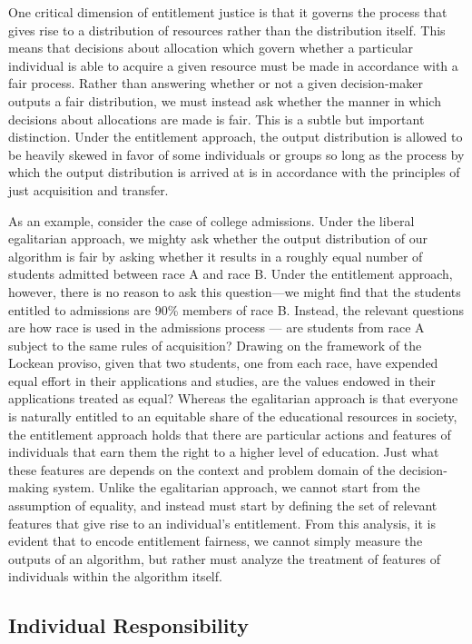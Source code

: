 One critical dimension of entitlement justice is that it governs the process
that gives rise to a distribution of resources rather than the distribution
itself. This means that decisions about allocation which govern whether a
particular individual is able to acquire a given resource must be made in
accordance with a fair process. Rather than answering whether or not a given
decision-maker outputs a fair distribution, we must instead ask whether the
manner in which decisions about allocations are made is fair. This is a
subtle but important distinction. Under the entitlement approach, the output
distribution is allowed to be heavily skewed in favor of some individuals or
groups so long as the process by which the output distribution is arrived at is
in accordance with the principles of just acquisition and transfer.

As an example, consider the case of college admissions. Under the liberal
egalitarian approach, we mighty ask whether the output distribution of our
algorithm is fair by asking whether it results in a roughly equal number of
students admitted between race A and race B. Under the entitlement approach,
however, there is no reason to ask this question—we might find that the
students entitled to admissions are 90\% members of race B. Instead, the
relevant questions are how race is used in the admissions process — are
students from race A subject to the same rules of acquisition? Drawing on the
framework of the Lockean proviso, given that two students, one from each race,
have expended equal effort in their applications and studies, are the values
endowed in their applications treated as equal? Whereas the egalitarian approach
is that everyone is naturally entitled to an equitable share of the educational
resources in society, the entitlement approach holds that there are particular
actions and features of individuals that earn them the right to a higher level
of education.  Just what these features are depends on the context and problem 
domain of the decision-making system. Unlike the egalitarian approach, we cannot
start from the assumption of equality, and instead must start by defining the 
set of relevant features that give rise to an individual's entitlement. From
this analysis, it is evident that to encode entitlement fairness, we cannot
simply measure the outputs of an algorithm, but rather must analyze the
treatment of features of individuals within the algorithm itself.

\subsection{Individual Responsibility}

